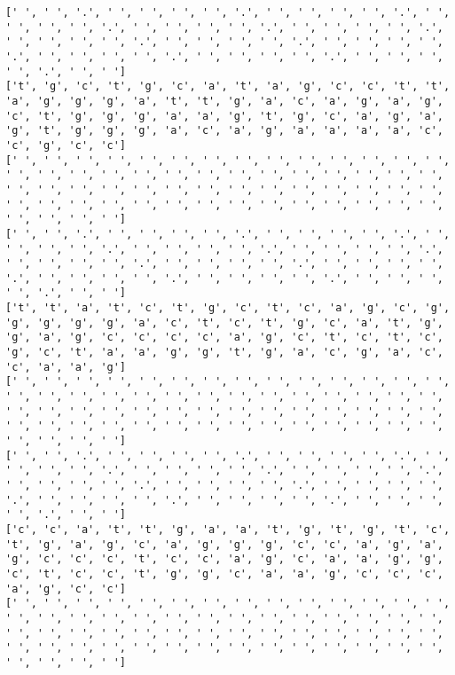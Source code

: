 \documentclass{article}
\begin{document}
\begin{Verbatim}
[' ', ' ', '.', ' ', ' ', ' ', ' ', '.', ' ', ' ', ' ', ' ', '.', ' ', ' ', ' ', ' ', '.', ' ', ' ', ' ', ' ', '.', ' ', ' ', ' ', ' ', '.', ' ', ' ', ' ', ' ', '.', ' ', ' ', ' ', ' ', '.', ' ', ' ', ' ', ' ', '.', ' ', ' ', ' ', ' ', '.', ' ', ' ', ' ', ' ', '.', ' ', ' ', ' ', ' ', '.', ' ', ' ']
['t', 'g', 'c', 't', 'g', 'c', 'a', 't', 'a', 'g', 'c', 'c', 't', 't', 'a', 'g', 'g', 'g', 'a', 't', 't', 'g', 'a', 'c', 'a', 'g', 'a', 'g', 'c', 't', 'g', 'g', 'g', 'a', 'a', 'g', 't', 'g', 'c', 'a', 'g', 'a', 'g', 't', 'g', 'g', 'g', 'a', 'c', 'a', 'g', 'a', 'a', 'a', 'a', 'c', 'c', 'g', 'c', 'c']
[' ', ' ', ' ', ' ', ' ', ' ', ' ', ' ', ' ', ' ', ' ', ' ', ' ', ' ', ' ', ' ', ' ', ' ', ' ', ' ', ' ', ' ', ' ', ' ', ' ', ' ', ' ', ' ', ' ', ' ', ' ', ' ', ' ', ' ', ' ', ' ', ' ', ' ', ' ', ' ', ' ', ' ', ' ', ' ', ' ', ' ', ' ', ' ', ' ', ' ', ' ', ' ', ' ', ' ', ' ', ' ', ' ', ' ', ' ', ' ']
[' ', ' ', '.', ' ', ' ', ' ', ' ', '.', ' ', ' ', ' ', ' ', '.', ' ', ' ', ' ', ' ', '.', ' ', ' ', ' ', ' ', '.', ' ', ' ', ' ', ' ', '.', ' ', ' ', ' ', ' ', '.', ' ', ' ', ' ', ' ', '.', ' ', ' ', ' ', ' ', '.', ' ', ' ', ' ', ' ', '.', ' ', ' ', ' ', ' ', '.', ' ', ' ', ' ', ' ', '.', ' ', ' ']
['t', 't', 'a', 't', 'c', 't', 'g', 'c', 't', 'c', 'a', 'g', 'c', 'g', 'g', 'g', 'g', 'g', 'a', 'c', 't', 'c', 't', 'g', 'c', 'a', 't', 'g', 'g', 'a', 'g', 'c', 'c', 'c', 'c', 'a', 'g', 'c', 't', 'c', 't', 'c', 'g', 'c', 't', 'a', 'a', 'g', 'g', 't', 'g', 'a', 'c', 'g', 'a', 'c', 'c', 'a', 'a', 'g']
[' ', ' ', ' ', ' ', ' ', ' ', ' ', ' ', ' ', ' ', ' ', ' ', ' ', ' ', ' ', ' ', ' ', ' ', ' ', ' ', ' ', ' ', ' ', ' ', ' ', ' ', ' ', ' ', ' ', ' ', ' ', ' ', ' ', ' ', ' ', ' ', ' ', ' ', ' ', ' ', ' ', ' ', ' ', ' ', ' ', ' ', ' ', ' ', ' ', ' ', ' ', ' ', ' ', ' ', ' ', ' ', ' ', ' ', ' ', ' ']
[' ', ' ', '.', ' ', ' ', ' ', ' ', '.', ' ', ' ', ' ', ' ', '.', ' ', ' ', ' ', ' ', '.', ' ', ' ', ' ', ' ', '.', ' ', ' ', ' ', ' ', '.', ' ', ' ', ' ', ' ', '.', ' ', ' ', ' ', ' ', '.', ' ', ' ', ' ', ' ', '.', ' ', ' ', ' ', ' ', '.', ' ', ' ', ' ', ' ', '.', ' ', ' ', ' ', ' ', '.', ' ', ' ']
['c', 'c', 'a', 't', 't', 'g', 'a', 'a', 't', 'g', 't', 'g', 't', 'c', 't', 'g', 'a', 'g', 'c', 'a', 'g', 'g', 'g', 'c', 'c', 'a', 'g', 'a', 'g', 'c', 'c', 'c', 't', 'c', 'c', 'a', 'g', 'c', 'a', 'a', 'g', 'g', 'c', 't', 'c', 'c', 't', 'g', 'g', 'c', 'a', 'a', 'g', 'c', 'c', 'c', 'a', 'g', 'c', 'c']
[' ', ' ', ' ', ' ', ' ', ' ', ' ', ' ', ' ', ' ', ' ', ' ', ' ', ' ', ' ', ' ', ' ', ' ', ' ', ' ', ' ', ' ', ' ', ' ', ' ', ' ', ' ', ' ', ' ', ' ', ' ', ' ', ' ', ' ', ' ', ' ', ' ', ' ', ' ', ' ', ' ', ' ', ' ', ' ', ' ', ' ', ' ', ' ', ' ', ' ', ' ', ' ', ' ', ' ', ' ', ' ', ' ', ' ', ' ', ' ']

\end{Verbatim}
\end{document}
